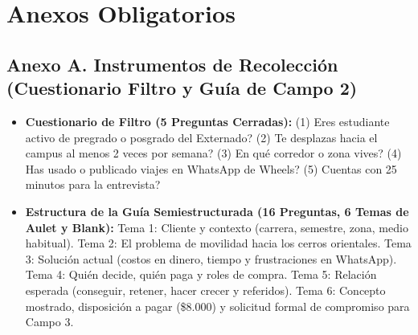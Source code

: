 \documentclass[11pt,a4paper]{article}
\begin{document}
\section*{Anexos Obligatorios}

\subsection*{Anexo A. Instrumentos de Recolecci\'on (Cuestionario Filtro y Gu\'ia de Campo 2)}
\begin{itemize}[leftmargin=*]
    \item \textbf{Cuestionario de Filtro (5 Preguntas Cerradas):} (1) \textquestiondown Eres estudiante activo de pregrado o posgrado del Externado? (2) \textquestiondown Te desplazas hacia el campus al menos 2 veces por semana? (3) \textquestiondown En qu\'e corredor o zona vives? (4) \textquestiondown Has usado o publicado viajes en WhatsApp de Wheels? (5) \textquestiondown Cuentas con 25 minutos para la entrevista?
    \item \textbf{Estructura de la Gu\'ia Semiestructurada (16 Preguntas, 6 Temas de Aulet y Blank):}  
    Tema 1: Cliente y contexto (carrera, semestre, zona, medio habitual).  
    Tema 2: El problema de movilidad hacia los cerros orientales.  
    Tema 3: Soluci\'on actual (costos en dinero, tiempo y frustraciones en WhatsApp).  
    Tema 4: Qui\'en decide, qui\'en paga y roles de compra.  
    Tema 5: Relaci\'on esperada (conseguir, retener, hacer crecer y referidos).  
    Tema 6: Concepto mostrado, disposici\'on a pagar (\$8.000) y solicitud formal de compromiso para Campo 3.
\end{itemize}
\end{document}
